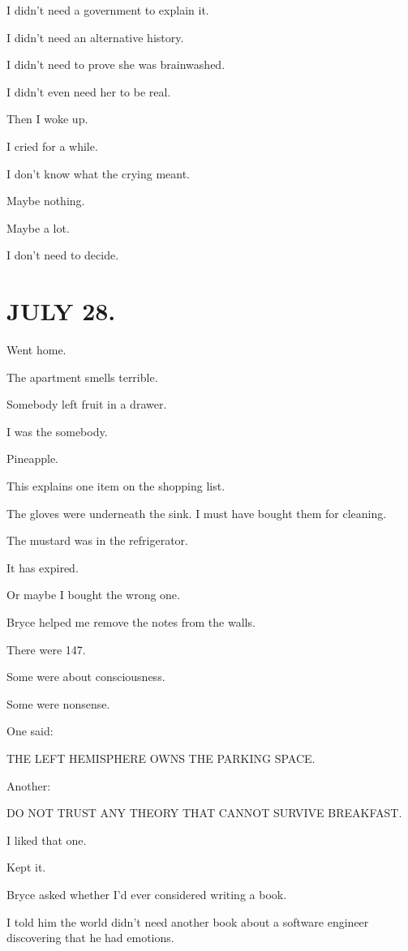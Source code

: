 \documentclass[11pt,oneside]{book}
\begin{document}
I didn't need a government to explain it.

I didn't need an alternative history.

I didn't need to prove she was brainwashed.

I didn't even need her to be real.

Then I woke up.

I cried for a while.

I don't know what the crying meant.

Maybe nothing.

Maybe a lot.

I don't need to decide.

\section*{JULY 28.}

Went home.

The apartment smells terrible.

Somebody left fruit in a drawer.

I was the somebody.

Pineapple.

This explains one item on the shopping list.

The gloves were underneath the sink. I must have bought them for cleaning.

The mustard was in the refrigerator.

It has expired.

Or maybe I bought the wrong one.

Bryce helped me remove the notes from the walls.

There were 147.

Some were about consciousness.

Some were nonsense.

One said:

THE LEFT HEMISPHERE OWNS THE PARKING SPACE.

Another:

DO NOT TRUST ANY THEORY THAT CANNOT SURVIVE BREAKFAST.

I liked that one.

Kept it.

Bryce asked whether I'd ever considered writing a book.

I told him the world didn't need another book about a software engineer discovering that he had emotions.
\end{document}
